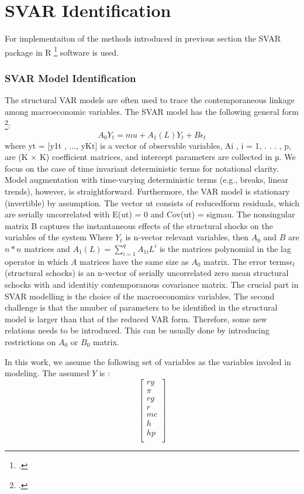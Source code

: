 \newpage
\section{\ac{SVAR} Identification} \label{SVARIdentification}

For implementaiton of the methods introduced in previous section the SVAR package in R \footcite[See.][]{Lange2020} software is used.
\subsubsection{SVAR Model Identification}
The structural VAR models are often used to trace the contemporaneous linkage among macroeconomic variables. The SVAR model has the following general form  \footcite[Source: See][]{Lange2020}: 
\[ A_0 Y_t = mu+  A_1(L) Y_t + B \epsilon_t \]
where yt = [y1t
, ..., yKt]
 is a vector of observable variables, Ai
, i = 1, . . . , p, are (K × K)
coefficient matrices, and intercept parameters are collected in µ. We focus on the case of time
invariant deterministic terms for notational clarity. Model augmentation with time-varying
deterministic terms (e.g., breaks, linear trends), however, is straightforward. Furthermore,
the VAR model is stationary (invertible) by assumption. The vector ut consists of reducedform residuals, which are serially uncorrelated with E(ut) = 0 and Cov(ut) = sigmau. The
nonsingular matrix B captures the instantaneous effects of the structural shocks
on the variables of the system
 Where $Y_t$ is n-vector relevant variables, then $A_0$ and $B$ are $n * n$ matrices and $A_1(L) = \sum\limits_{i=1}^ qA_{1i} L^i $ is the matrices polynomial in the lag operator in which $A$ matrices have the same size as $A_0$ matrix. The error terms$\epsilon_t$ (structural schocks) is an n-vector of serially uncorrelated zero mean structural schocks with and identitiy contemporanous covariance matrix. The crucial part in SVAR modelling is the choice of the macroeconomics variables. The second challenge is that the nmuber of parameters to be identified in the structural model is larger than that of the reduced VAR form. Therefore, some new relations needs to be introduced. This can be usually done by introducing restrictions on $A_0$ or $B_0$ matrix. 

In this work, we assume the following set of variables as the variables involed in modeling. 
The assumed $Y$ is :
\[ 
 \begin{bmatrix}
        ry \\ 
        \pi \\
        rg \\
        r \\
        mc \\
        h \\
        hp \\
  \end{bmatrix}
\]

